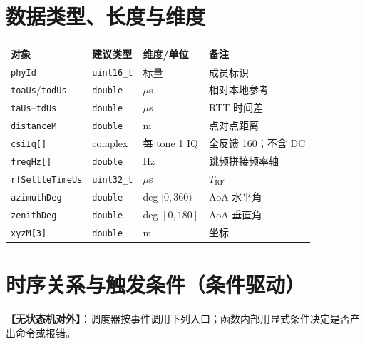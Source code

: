 \documentclass[11pt,a4paper]{ctexart}
\begin{document}
\section{数据类型、长度与维度}

\begin{table}[h]
\centering
\small
\begin{tabular}{L{3.4cm}L{2.4cm}L{2.8cm}L{4.6cm}}
\toprule
\textbf{对象} & \textbf{建议类型} & \textbf{维度/单位} & \textbf{备注} \\
\midrule
\texttt{phyId} & \texttt{uint16\_t} & 标量 & 成员标识 \\
\texttt{toaUs}/\texttt{todUs} & \texttt{double} & $\mu$s & 相对本地参考 \\
\texttt{taUs}--\texttt{tdUs} & \texttt{double} & $\mu$s & RTT 时间差 \\
\texttt{distanceM} & \texttt{double} & m & 点对点距离 \\
\texttt{csiIq[]} & complex & 每 tone 1 IQ & 全反馈 160；不含 DC \\
\texttt{freqHz[]} & \texttt{double} & Hz & 跳频拼接频率轴 \\
\texttt{rfSettleTimeUs} & \texttt{uint32\_t} & $\mu$s & $T_{\mathrm{RF}}$ \\
\texttt{azimuthDeg} & \texttt{double} & deg $[0,360)$ & AoA 水平角 \\
\texttt{zenithDeg} & \texttt{double} & deg $[0,180]$ & AoA 垂直角 \\
\texttt{xyzM[3]} & \texttt{double} & m & 坐标 \\
\bottomrule
\end{tabular}
\end{table}

\section{时序关系与触发条件（条件驱动）}

\textbf{【无状态机对外】}：调度器按事件调用下列入口；函数内部用显式条件决定是否产出命令或报错。
\end{document}

